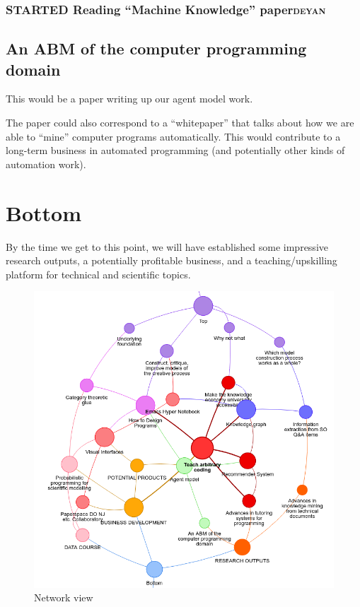 \documentclass[11pt]{article}
\begin{document}
\subsubsection{{\bfseries\sffamily STARTED} Reading ``Machine Knowledge'' paper\hfill{}\textsc{deyan}}
\label{sec:org65ffada}
\subsection{An ABM of the computer programming domain}
\label{sec:org0195cd1}
This would be a paper writing up our agent model work.

The paper could also correspond to a “whitepaper” that talks about how
we are able to “mine” computer programs automatically.  This would
contribute to a long-term business in automated programming (and
potentially other kinds of automation work).
\section{Bottom}
\label{sec:orgfc6df8f}
By the time we get to this point, we will have established some
impressive research outputs, a potentially profitable business, and a
teaching/upskilling platform for technical and scientific topics.

\begin{figure}[htbp]
\centering
\includegraphics[width=\textwidth]{org-roam-server-3oct2020.png}
\caption{Network view}
\end{figure}
\end{document}
